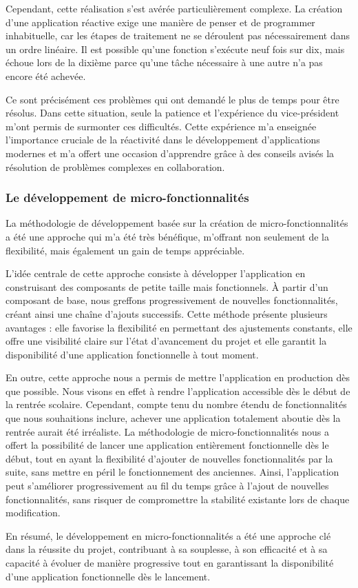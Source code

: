 Cependant, cette réalisation s'est avérée particulièrement complexe. La création d'une application réactive exige une manière de penser et de programmer inhabituelle, car les étapes de traitement ne se déroulent pas nécessairement dans un ordre linéaire. Il est possible qu'une fonction s'exécute neuf fois sur dix, mais échoue lors de la dixième parce qu'une tâche nécessaire à une autre n'a pas encore été achevée.

Ce sont précisément ces problèmes qui ont demandé le plus de temps pour être résolus. Dans cette situation, seule la patience et l'expérience du vice-président m'ont permis de surmonter ces difficultés. Cette expérience m'a enseignée l'importance cruciale de la réactivité dans le développement d'applications modernes et m'a offert une occasion d'apprendre grâce à des conseils avisés la résolution de problèmes complexes en collaboration.

\subsubsection{Le développement de micro-fonctionnalités}

La méthodologie de développement basée sur la création de micro-fonctionnalités a été une approche qui m'a été très bénéfique, m'offrant non seulement de la flexibilité, mais également un gain de temps appréciable.

L'idée centrale de cette approche consiste à développer l'application en construisant des composants de petite taille mais fonctionnels. À partir d'un composant de base, nous greffons progressivement de nouvelles fonctionnalités, créant ainsi une chaîne d'ajouts successifs. Cette méthode présente plusieurs avantages : elle favorise la flexibilité en permettant des ajustements constants, elle offre une visibilité claire sur l'état d'avancement du projet et elle garantit la disponibilité d'une application fonctionnelle à tout moment.

En outre, cette approche nous a permis de mettre l'application en production dès que possible. Nous visons en effet à rendre l'application accessible dès le début de la rentrée scolaire. Cependant, compte tenu du nombre étendu de fonctionnalités que nous souhaitions inclure, achever une application totalement aboutie dès la rentrée aurait été irréaliste. La méthodologie de micro-fonctionnalités nous a offert la possibilité de lancer une application entièrement fonctionnelle dès le début, tout en ayant la flexibilité d'ajouter de nouvelles fonctionnalités par la suite, sans mettre en péril le fonctionnement des anciennes. Ainsi, l'application peut s'améliorer progressivement au fil du temps grâce à l'ajout de nouvelles fonctionnalités, sans risquer de compromettre la stabilité existante lors de chaque modification.

En résumé, le développement en micro-fonctionnalités a été une approche clé dans la réussite du projet, contribuant à sa souplesse, à son efficacité et à sa capacité à évoluer de manière progressive tout en garantissant la disponibilité d'une application fonctionnelle dès le lancement.